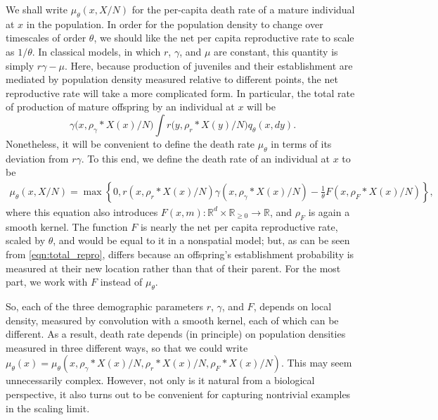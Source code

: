 \documentclass[EJP]{ejpecp} %
\newcommand{\IR}{\mathbb R}
\newcommand{\kernel}{\rho}  %
\newcommand{\smooth}[1]{\kernel_{#1} \! * \!}  %
\begin{document}
We shall write $\mu_\theta(x, X/N)$ for the per-capita death rate of a mature individual
at $x$ in the population.
In order for the 
population density to change over timescales of order $\theta$, we should like the net 
per capita reproductive rate 
to scale as $1/\theta$. 
In classical models, in which $r$, $\gamma$, and $\mu$ are constant, 
this quantity is simply $r\gamma -\mu$. 
Here, because production of juveniles and their establishment are
mediated by population density measured relative to different points, 
the net reproductive rate will take a more complicated form. 
In particular, the total rate of production of mature offspring by an individual at $x$ will be
\begin{equation} \label{eqn:total_repro}
	\gamma\big(x,\smooth{\gamma}X(x)/N\big)\int r\big(y, \smooth{r}X(y)/N\big)q_{\theta}(x,dy).
\end{equation}
Nonetheless, it will be convenient to define the death rate $\mu_\theta$ in terms of 
its deviation from $r\gamma$. 
To this end, we define
the death rate of an individual at $x$ to be 
\begin{align} \label{eqn:mu_defn}
    \mu_\theta(x, X/N)
    =
    \max\left\{0, 
        r(x, \smooth{r} X(x) / N) \gamma(x, \smooth{\gamma} X(x) / N)
        - \frac{1}{\theta} F(x, \smooth{F} X(x) / N)
    \right\} ,
\end{align}
where this equation also introduces $F(x, m) : \IR^d \times \IR_{\ge 0} \to \IR$,
and $\rho_F$ is again a smooth kernel. 
The function $F$ is nearly
the net per capita reproductive rate, scaled by $\theta$,
and would be equal to it in a nonspatial model;
but, as can be seen from \eqref{eqn:total_repro},
differs because an offspring's establishment probability is measured at their new location
rather than that of their parent.
For the most part, we work with $F$ instead of $\mu_\theta$.

So, each of the three demographic parameters $r$, $\gamma$, and $F$,
depends on local density, measured by convolution with a smooth kernel,
each of which can be different.
As a result, death rate depends (in principle) on population densities measured in 
three different ways, 
so that we could write 
$\mu_\theta(x) = \mu_\theta(x, \smooth{\gamma} X(x) / N, \smooth{r} X(x) / N, \smooth{F} X(x) / N)$.
This may seem unnecessarily complex.
However, not only is it natural from a 
biological perspective, it also turns out to be convenient for
capturing nontrivial examples in the scaling limit.
\end{document}
